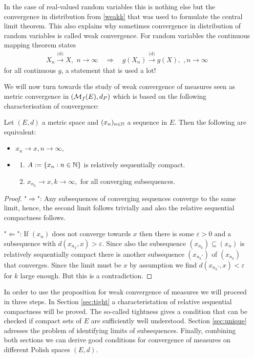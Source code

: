 In the case of real-valued random variables this is nothing else but the convergence in distribution from \eqref{weakk} that was used to formulate the central limit theorem. This also explains why sometimes convergence in distribution of random variables is called weak convergence. For random variables the continuous mapping theorem states
\begin{align*}
	X_n\overset{\text{(d)}}{\longrightarrow} X,\,\,n\to\infty\quad \Longrightarrow\quad g(X_n)\overset{\text{(d)}}{\longrightarrow} g(X),\,\,,n\to\infty
\end{align*}
for all continuous $g$, a statement that is used a lot!\smallskip

We will now turn towards the study of weak convergence of measures seen as metric convergence in $(\mathcal{M}_f(E),d_P)$ which is based on the following characterisation of convergence:
\begin{lsatzwichtig}
\begin{prop}\label{propkonvergenz}
	Let $(E,d)$ a metric space and $(x_n)_{n\in\mathbb{N}}$ a sequence in $E$. Then the following are equivalent:
	\begin{itemize}
		\item $x_n\to x, n\to\infty,$
		\item 
		\begin{enumerate}[label=(\roman*)]
			\item $A:=\{x_n:n\in\mathbb{N}\}$ is relatively sequentially compact.
			\item $x_{n_k}\to x,k\to\infty,$ for all converging subsequences.
		\end{enumerate}
	\end{itemize}
\end{prop}
\end{lsatzwichtig}
\begin{proof}[Proof]
	"$\Rightarrow$": Any subsequences of converging sequences converge to the same limit, hence, the second limit follows trivially and also the relative sequential compactness follows.\smallskip
	
	"$\Leftarrow$": If $(x_n)$ does not converge towards $x$ then there is some $\varepsilon>0$ and a subsequence with $d(x_{n_k},x)>\varepsilon$. Since also the subsequence $(x_{n_k})\subseteq (x_n)$ is relatively sequentially compact there is another subsequence $(x_{n_k'})$ of $(x_{n_k})$ that converges. Since the limit must be $x$ by assumption we find $d(x_{n_k'},x)<\varepsilon$ for $k$ large enough. But this is a contradiction.
\end{proof}
In order to use the proposition for weak convergence of measures we will proceed in three steps. In Section \ref{sec:tight} a characteristation of relative sequential compactness will be proved. The so-called tightness gives a condition that can be checked if compact sets of $E$ are sufficiently well understood. Section \ref{sec:unique} adresses the problem of identifying limits of subsequences. Finally, combining both sections we can derive good conditions for convergence of measures on different Polish spaces $(E,d)$. 


